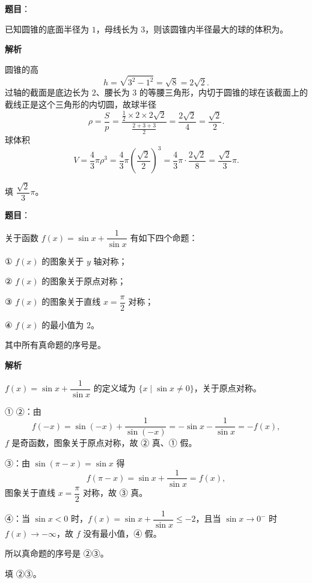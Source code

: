 \begin{answer}

\textbf{题目}：

已知圆锥的底面半径为 $1$，母线长为 $3$，则该圆锥内半径最大的球的体积为\gkblank{}。

\textbf{解析}

圆锥的高
\nopagebreak[4]
\[h=\sqrt{3^2-1^2}=\sqrt8=2\sqrt2 .\]
过轴的截面是底边长为 $2$、腰长为 $3$ 的等腰三角形，内切于圆锥的球在该截面上的截线正是这个三角形的内切圆，故球半径
\nopagebreak[4]
\[\rho=\frac{S}{p}=\frac{\frac12\times2\times2\sqrt2}{\frac{2+3+3}2}=\frac{2\sqrt2}{4}=\frac{\sqrt2}2 .\]
球体积
\nopagebreak[4]
\[V=\frac43\pi\rho^3=\frac43\pi\left(\frac{\sqrt2}2\right)^3=\frac43\pi\cdot\frac{2\sqrt2}8=\frac{\sqrt2}3\pi .\]

填 $\dfrac{\sqrt2}3\pi$。


\end{answer}
\begin{answer}

\textbf{题目}：

关于函数 $f(x)=\sin x+\dfrac1{\sin x}$ 有如下四个命题：

① $f(x)$ 的图象关于 $y$ 轴对称；

② $f(x)$ 的图象关于原点对称；

③ $f(x)$ 的图象关于直线 $x=\dfrac\pi2$ 对称；

④ $f(x)$ 的最小值为 $2$。

其中所有真命题的序号是\gkblank{}。

\textbf{解析}

$f(x)=\sin x+\dfrac1{\sin x}$ 的定义域为 $\{x\mid\sin x\neq0\}$，关于原点对称。

① ②：由
\nopagebreak[4]
\[f(-x)=\sin(-x)+\frac1{\sin(-x)}=-\sin x-\frac1{\sin x}=-f(x),\]
$f$ 是奇函数，图象关于原点对称，故 ② 真、① 假。

③：由 $\sin(\pi-x)=\sin x$ 得
\nopagebreak[4]
\[f(\pi-x)=\sin x+\frac1{\sin x}=f(x),\]
图象关于直线 $x=\dfrac\pi2$ 对称，故 ③ 真。

④：当 $\sin x<0$ 时，$f(x)=\sin x+\dfrac1{\sin x}\leqslant-2$，且当 $\sin x\to0^-$ 时 $f(x)\to-\infty$，故 $f$ 没有最小值，④ 假。

所以真命题的序号是 ②③。

填 ②③。


\end{answer}
